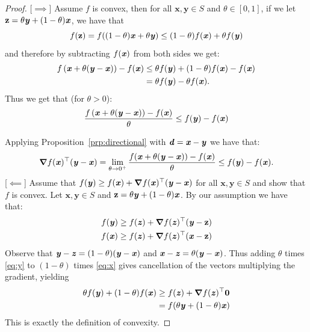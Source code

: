 \begin{proof}

  [$\implies$] Assume $f$ is convex, then for all $\mathbf{x,y} \in S$
  and $\theta \in [0,1]$, if we let $\mathbf z = \theta \yy +
  (1-\theta)\xx$, we have that
  \[
    f(\mathbf z) = f((1-\theta)\xx + \theta \yy) \leq
    (1-\theta)f(\xx) + \theta f(\yy)
    \]
    and therefore by subtracting $f(\xx)$ from both sides we get:
\begin{align*}
f\left (\xx + \theta (\yy -\xx)   \right) - f(\xx)
& \leq \theta f(\yy) + (1-\theta)f(\xx) - f(\xx) \\
  & = \theta f(\yy) - \theta f(\xx).
\end{align*}
%
%
Thus we get that (for $\theta > 0$):
$$\frac{f\left (\xx + \theta (\yy -\xx)   \right) - f(\xx)}{\theta} \leq  f(\yy) -  f(\xx)$$

Applying Proposition~\ref{prp:directional} with $\dd =\xx - \yy$ we have that: %
%
$$\grad f(\xx)^\trp (\yy-\xx) = \lim_{\theta \to 0^{+}} \frac{f(\xx + \theta (\yy - \xx)) - f(\xx)}{\theta} \leq f(\yy) - f(\xx).$$
%
[$\impliedby$] Assume that $f(\yy) \geq f(\xx) + \grad f(\xx)^\trp  (\yy-\xx)$ for all $\mathbf{x,y} \in S$ and show that $f$ is convex.  Let $\mathbf{x,y} \in S$ and $\mathbf z = \theta \yy+(1-\theta)\xx$.  By our assumption we have that:
%
\begin{align}
f(\yy) \geq f(\zz) + \grad f(\zz)^\trp (\yy - \mathbf z) \label{eq:y}  \\
f(\xx) \geq f(\zz) + \grad f(\zz)^\trp (\xx - \mathbf z) \label{eq:x}
\end{align}
%
Observe that $\yy-\zz = (1-\theta)(\yy-\xx)$ and $\xx-\zz = \theta
(\yy-\xx)$.
Thus adding
$\theta$ times \eqref{eq:y} to $(1-\theta)$ times \eqref{eq:x} gives
cancellation of the vectors multiplying the gradient, yielding
\begin{align*}
\theta f(\yy) + (1-\theta)f(\xx)  \nonumber
  & \geq  f(\zz) +  \grad f(\zz)^\trp \veczero
  \\
  & =f(\theta \yy+(1-\theta)\xx)
\end{align*}
This is exactly the definition of convexity.
\end{proof}


